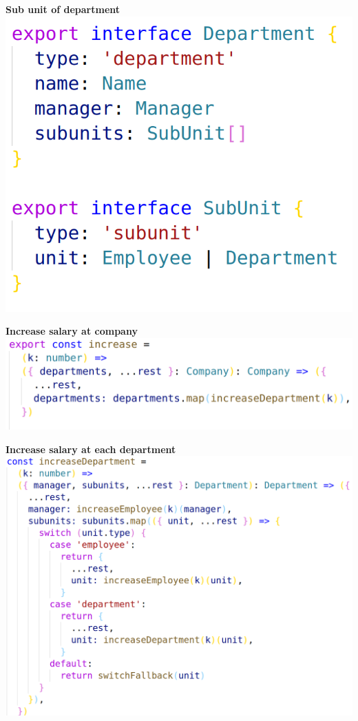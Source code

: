 \documentclass[14pt]{beamer}
\begin{document}
\begin{frame}
  \textbf{Sub unit of department}
  \vfill
  \includegraphics[height=0.8\textheight,width=\textwidth,keepaspectratio]{graphics/interface-subunit-ts.png}
\end{frame}

\begin{frame}
  \textbf{Increase salary at company}
  \vfill
  \includegraphics[height=0.9\textheight,width=\textwidth,keepaspectratio]{graphics/increase-naive-step1-ts.png}
\end{frame}

\begin{frame}
  \textbf{Increase salary at each department}
  \vfill
  \includegraphics[height=0.8\textheight,width=\textwidth,keepaspectratio]{graphics/increase-naive-step2-ts.png}
\end{frame}
\end{document}
